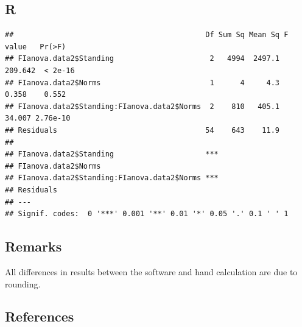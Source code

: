 \documentclass[
]{book}
\newenvironment{Shaded}{\begin{snugshade}}{\end{snugshade}}
\newcommand{\CommentTok}[1]{\textcolor[rgb]{0.56,0.35,0.01}{\textit{#1}}}
\newcommand{\DataTypeTok}[1]{\textcolor[rgb]{0.13,0.29,0.53}{#1}}
\newcommand{\KeywordTok}[1]{\textcolor[rgb]{0.13,0.29,0.53}{\textbf{#1}}}
\newcommand{\NormalTok}[1]{#1}
\newcommand{\OperatorTok}[1]{\textcolor[rgb]{0.81,0.36,0.00}{\textbf{#1}}}
\newcommand{\StringTok}[1]{\textcolor[rgb]{0.31,0.60,0.02}{#1}}
\begin{document}
\hypertarget{r-1}{%
\subsection{R}\label{r-1}}

\begin{Shaded}
\end{Shaded}

\begin{verbatim}
##                                            Df Sum Sq Mean Sq F value   Pr(>F)
## FIanova.data2$Standing                      2   4994  2497.1 209.642  < 2e-16
## FIanova.data2$Norms                         1      4     4.3   0.358    0.552
## FIanova.data2$Standing:FIanova.data2$Norms  2    810   405.1  34.007 2.76e-10
## Residuals                                  54    643    11.9                 
##                                               
## FIanova.data2$Standing                     ***
## FIanova.data2$Norms                           
## FIanova.data2$Standing:FIanova.data2$Norms ***
## Residuals                                     
## ---
## Signif. codes:  0 '***' 0.001 '**' 0.01 '*' 0.05 '.' 0.1 ' ' 1
\end{verbatim}

\hypertarget{remarks-1}{%
\subsection{Remarks}\label{remarks-1}}

All differences in results between the software and hand calculation are due to rounding.

\hypertarget{references-1}{%
\subsection{References}\label{references-1}}
\end{document}
